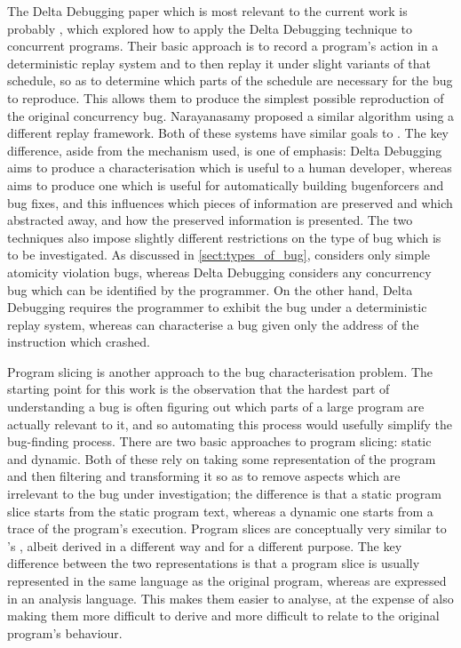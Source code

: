 The Delta Debugging paper which is most relevant to the current work
is probably \cite{Choi2002}, which explored how to
apply the Delta Debugging technique to concurrent programs.  Their
basic approach is to record a program's action in a deterministic
replay system and to then replay it under slight variants of that
schedule, so as to determine which parts of the schedule are necessary
for the bug to reproduce.  This allows them to produce the simplest
possible reproduction of the original concurrency bug.
Narayanasamy\cite{Narayanasamy2007} proposed a similar algorithm using
a different replay framework.  Both of these systems have similar
goals to {\technique}.  The key difference, aside from the mechanism
used, is one of emphasis: Delta Debugging aims to produce a
characterisation which is useful to a human developer, whereas
{\technique} aims to produce one which is useful for automatically
building \glspl{bugenforcer} and bug fixes, and this influences which
pieces of information are preserved and which abstracted away, and how
the preserved information is presented.  The two techniques also
impose slightly different restrictions on the type of bug which is to
be investigated.  As discussed in \autoref{sect:types_of_bug},
{\technique} considers only simple atomicity violation bugs, whereas
Delta Debugging considers any concurrency bug which can be identified
by the programmer.  On the other hand, Delta Debugging requires the
programmer to exhibit the bug under a deterministic replay system,
whereas {\technique} can characterise a bug given only the address of
the instruction which crashed.

Program slicing is another approach to the bug characterisation
problem.  The starting point for this work is the observation that the
hardest part of understanding a bug is often figuring out which parts
of a large program are actually relevant to it, and so automating this
process would usefully simplify the bug-finding process.  There are
two basic approaches to program slicing: static\cite{Weiser1981} and
dynamic\cite{Agrawal1990a}.  Both of these rely on taking some
representation of the program and then filtering and transforming it
so as to remove aspects which are irrelevant to the bug under
investigation; the difference is that a static program slice starts
from the static program text, whereas a dynamic one starts from a
trace of the program's execution.  Program slices are conceptually
very similar to {\technique}'s {\StateMachines}, albeit derived in a
different way and for a different purpose.  The key difference between
the two representations is that a program slice is usually represented
in the same language as the original program, whereas {\StateMachines}
are expressed in an analysis language.  This makes them easier to
analyse, at the expense of also making them more difficult to derive
and more difficult to relate to the original program's behaviour.

